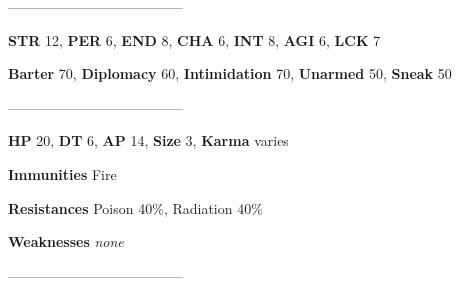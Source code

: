 \documentclass[11pt,a4paper,twocolumn]{book}
\begin{document}
%		
%	
%		

	--------------------------------------

	\noindent
	\textbf{STR} 12, \textbf{PER} 6, \textbf{END} 8, \textbf{CHA} 6, \textbf{INT} 8, \textbf{AGI} 6, \textbf{LCK} 7
	
	\noindent
	\textbf{Barter} 70, \textbf{Diplomacy} 60, \textbf{Intimidation} 70, \textbf{Unarmed} 50, \textbf{Sneak} 50
	
	--------------------------------------
	
	\noindent
	\textbf{HP} 20, \textbf{DT} 6, \textbf{AP} 14, \textbf{Size} 3, \textbf{Karma} varies
	
	
	\noindent
	\textbf{Immunities} Fire
	
	\noindent
	\textbf{Resistances} Poison 40\%, Radiation 40\%
	
	\noindent
	\textbf{Weaknesses} \emph{none} %
	
	--------------------------------------
	
\end{document}
